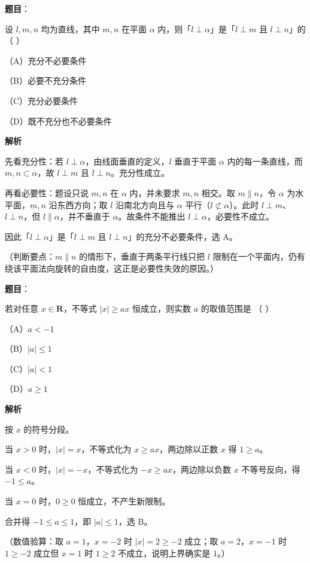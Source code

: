 \begin{answer}

\textbf{题目}：

设 $l,m,n$ 均为直线，其中 $m,n$ 在平面 $\alpha$ 内，则「$l\perp\alpha$」是「$l\perp m$ 且 $l\perp n$」的 （ ）

（A）充分不必要条件

（B）必要不充分条件

（C）充分必要条件

（D）既不充分也不必要条件

\textbf{解析}

先看充分性：若 $l\perp\alpha$，由线面垂直的定义，$l$ 垂直于平面 $\alpha$ 内的每一条直线，而 $m,n\subset\alpha$，故 $l\perp m$ 且 $l\perp n$。充分性成立。

再看必要性：题设只说 $m,n$ 在 $\alpha$ 内，并未要求 $m,n$ 相交。取 $m\parallel n$，令 $\alpha$ 为水平面，$m,n$ 沿东西方向；取 $l$ 沿南北方向且与 $\alpha$ 平行（$l\not\subset\alpha$）。此时 $l\perp m$、$l\perp n$，但 $l\parallel\alpha$，并不垂直于 $\alpha$。故条件不能推出 $l\perp\alpha$，必要性不成立。

因此「$l\perp\alpha$」是「$l\perp m$ 且 $l\perp n$」的充分不必要条件，选 A。

（判断要点：$m\parallel n$ 的情形下，垂直于两条平行线只把 $l$ 限制在一个平面内，仍有绕该平面法向旋转的自由度，这正是必要性失效的原因。）


\end{answer}
\begin{answer}

\textbf{题目}：

若对任意 $x\in\mathbf R$，不等式 $|x|\geqslant ax$ 恒成立，则实数 $a$ 的取值范围是 （ ）

（A）$a<-1$

（B）$|a|\leqslant1$

（C）$|a|<1$

（D）$a\geqslant1$

\textbf{解析}

按 $x$ 的符号分段。

当 $x>0$ 时，$|x|=x$，不等式化为 $x\geqslant ax$，两边除以正数 $x$ 得 $1\geqslant a$。

当 $x<0$ 时，$|x|=-x$，不等式化为 $-x\geqslant ax$，两边除以负数 $x$ 不等号反向，得 $-1\leqslant a$。

当 $x=0$ 时，$0\geqslant0$ 恒成立，不产生新限制。

合并得 $-1\leqslant a\leqslant1$，即 $|a|\leqslant1$，选 B。

（数值验算：取 $a=1$，$x=-2$ 时 $|x|=2\geqslant-2$ 成立；取 $a=2$，$x=-1$ 时 $1\geqslant-2$ 成立但 $x=1$ 时 $1\geqslant2$ 不成立，说明上界确实是 $1$。）


\end{answer}
